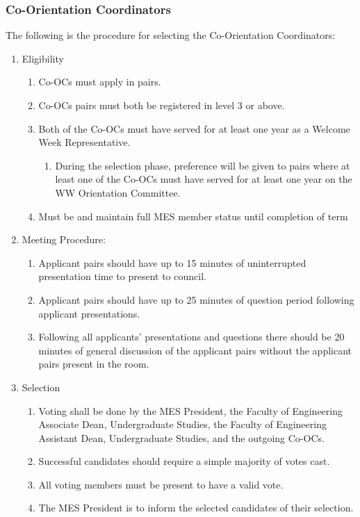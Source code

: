\subsubsection{Co-Orientation Coordinators}
\label{co-orientation-coordinators-eligibility}
The following is the procedure for selecting the Co-Orientation
Coordinators:

\begin{enumerate}
 \item
  Eligibility

  \begin{enumerate}
   \item
    Co-OCs must apply in pairs.
   \item
    Co-OCs pairs must both be registered in level 3 or above.
   \item
    Both of the Co-OCs must have served for at least one year as a Welcome Week Representative.

    \begin{enumerate}
     \item
      During the selection phase, preference will be given to pairs where at least one of the Co-OCs must have served for at least one year on the WW Orientation Committee.
    \end{enumerate}
   \item
    Must be and maintain full MES member status until completion of term
  \end{enumerate}
 \item
  Meeting Procedure:

  \begin{enumerate}
   \item
    Applicant pairs should have up to 15 minutes of uninterrupted presentation time to present to council.
   \item
    Applicant pairs should have up to 25 minutes of question period following applicant presentations.
   \item
    Following all applicants' presentations and questions there should be 20 minutes of general discussion of the applicant pairs without the applicant pairs present in the room.
  \end{enumerate}
 \item
  Selection

  \begin{enumerate}
   \item
    Voting shall be done by the MES President, the Faculty of Engineering Associate Dean, Undergraduate Studies, the Faculty of Engineering Assistant Dean, Undergraduate Studies, and the outgoing Co-OCs.
   \item
    Successful candidates should require a simple majority of votes cast.
   \item
    All voting members must be present to have a valid vote.
   \item
    The MES President is to inform the selected candidates of their selection.
  \end{enumerate}

\end{enumerate}

